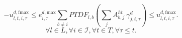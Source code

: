 \begin{equation}
-u_{l,t,i,\tau}^{d,\text{fmax}} \le e_{i,\tau}^{d, \text{max}} \sum_{b \neq i} PTDF_{l,b} \left( \sum_{j}A_{b,j}^{ht} \: \gamma_{j,t,\tau}^{d} \right ) \le u_{l,t,i,\tau}^{d,\text{fmax}}.
\end{equation}
\begin{equation*}
    \forall l \in L, \forall i \in \mathcal{I}, \forall t \in T, \forall \tau \leq t.
\end{equation*}











